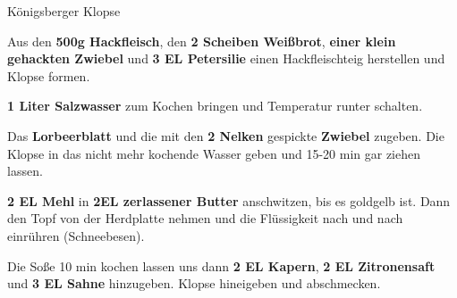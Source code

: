 \begin{recipe}[]{Königsberger Klopse} %

\step
Aus den \textbf{500g Hackfleisch}, den \textbf{2 Scheiben Weißbrot},
\textbf{einer klein gehackten Zwiebel} und \textbf{3 EL Petersilie} 
einen Hackfleischteig herstellen und Klopse formen.

\step
\textbf{1 Liter Salzwasser} zum Kochen bringen und Temperatur runter schalten. 

\step
Das \textbf{Lorbeerblatt} und die mit den \textbf{2 Nelken} gespickte \textbf{Zwiebel} zugeben.
Die Klopse in das nicht mehr kochende Wasser geben und 15-20 min gar ziehen lassen.

\step
\textbf{2 EL Mehl} in \textbf{2EL zerlassener Butter} anschwitzen, bis es goldgelb ist. Dann den Topf von der Herdplatte nehmen und die Flüssigkeit nach und nach einrühren (Schneebesen).

\step
Die Soße 10 min kochen lassen uns dann \textbf{2 EL Kapern}, \textbf{2 EL Zitronensaft} und \textbf{3 EL Sahne} hinzugeben. Klopse hineigeben und abschmecken.

\end{recipe}